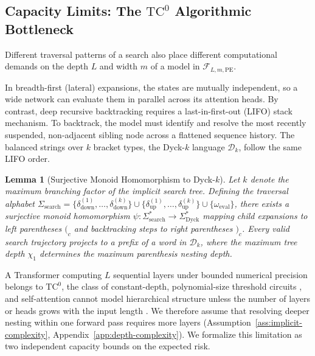 \documentclass{article}
\newtheorem{lemma}{Lemma}
\begin{document}
\subsection{Capacity Limits: The \texorpdfstring{$\text{TC}^0$}{TC0} Algorithmic Bottleneck}

Different traversal patterns of a search also place different computational demands on the depth $L$ and width $m$ of a model in $\mathcal{F}_{L, m, \mathrm{PE}}$. 

In breadth-first (lateral) expansions, the states are mutually independent, so a wide network can evaluate them in parallel across its attention heads. By contrast, deep recursive backtracking requires a last-in-first-out (LIFO) stack mechanism. To backtrack, the model must identify and resolve the most recently suspended, non-adjacent sibling node across a flattened sequence history. The balanced strings over $k$ bracket types, the Dyck-$k$ language $\mathcal{D}_k$, follow the same LIFO order.

\begin{lemma}[Surjective Monoid Homomorphism to Dyck-$k$]
\label{lemma:dyck_homomorphism}
Let $k$ denote the maximum branching factor of the implicit search tree. Defining the traversal alphabet $\Sigma_{\mathrm{search}} = \{ \delta_{\mathrm{down}}^{(1)}, \dots, \delta_{\mathrm{down}}^{(k)} \} \cup \{ \delta_{\mathrm{up}}^{(1)}, \dots, \delta_{\mathrm{up}}^{(k)} \} \cup \{ \omega_{\mathrm{eval}} \}$, there exists a surjective monoid homomorphism $\psi: \Sigma_{\mathrm{search}}^* \to \Sigma_{\mathrm{Dyck}}^*$ mapping child expansions to left parentheses $(_c$ and backtracking steps to right parentheses $)_c$. Every valid search trajectory projects to a prefix of a word in $\mathcal{D}_k$, where the maximum tree depth $\chi_1$ determines the maximum parenthesis nesting depth.
\end{lemma}

A Transformer computing $L$ sequential layers under bounded numerical precision belongs to $\text{TC}^0$, the class of constant-depth, polynomial-size threshold circuits \citep{merrill2023parallelismtradeofflimitationslogprecision}, and self-attention cannot model hierarchical structure unless the number of layers or heads grows with the input length \citep{Hahn_2020}. We therefore assume that resolving deeper nesting within one forward pass requires more layers (Assumption~\ref{ass:implicit-complexity}, Appendix~\ref{app:depth-complexity}). We formalize this limitation as two independent capacity bounds on the expected risk. %
\end{document}
